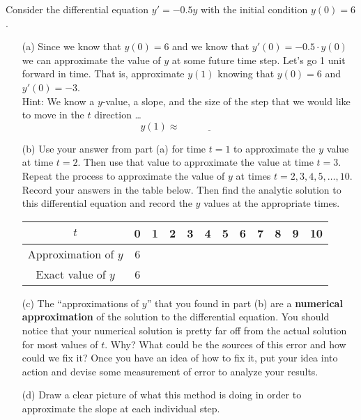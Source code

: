 \begin{problem}\label{prob:euler_motivation}
    Consider the differential equation $y' = -0.5y$ with the initial condition $y(0) = 6$.  
    \begin{enumerate}
        \item[(a)] Since we know that $y(0) = 6$ and we know that $y'(0) = -0.5 \cdot y(0)$
            we can approximate the value of $y$ at some future time step.  Let's go 1 unit
            forward in time.  That is, approximate $y(1)$ knowing that $y(0) = 6$ and
            $y'(0) = -3$. \\
            Hint: We know a $y$-value, a slope, and the size of the step that we would
            like to move in the $t$ direction \ldots
            \[ y(1) \approx \underline{\hspace{1in}} \]
        \item[(b)] Use your answer from part (a) for time $t=1$ to approximate the $y$
            value at time $t=2$.  Then use that value to approximate the value at time
            $t=3$.  Repeat the process to approximate the value of $y$ at
            times $t=2, 3, 4, 5, \ldots, 10$.  Record your answers in the table below.
            Then find the analytic solution to this differential equation and record the
            $y$ values at the appropriate times.
            \begin{center}
                \begin{tabular}{|c|c|c|c|c|c|c|c|c|c|c|c|}
                    \hline
                    $t$ & 0 & 1 & 2 & 3 & 4 & 5 & 6 & 7 & 8 & 9 & 10 \\ \hline
                    Approximation of $y$ & 6 &   &   &   &   &   &   &   &   &   &   \\ \hline
                    Exact value of $y$ & 6 &   &   &   &   &   &   &   &   &   &   \\ \hline
                \end{tabular}
            \end{center}
        \item[(c)] The ``approximations of $y$'' that you found in part (b) are a {\bf
            numerical approximation} of the solution to the differential equation.  You
            should notice that your numerical solution is pretty far off from the actual
            solution for most values of $t$.  Why?  What could be the sources of this
            error and how could we fix it?  Once you have an idea of how to fix it, put
            your idea into action and devise some measurement of error to analyze your
            results.
        \item[(d)] Draw a clear picture of what this method is doing in order to
            approximate the slope at each individual step.
    \end{enumerate}
\end{problem}

